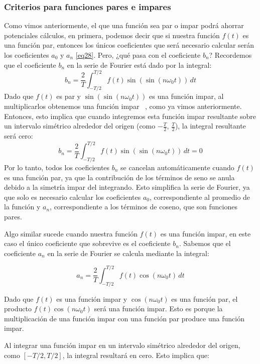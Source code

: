 \subsubsection{Criterios para funciones pares e impares}
Como vimos anteriormente, el que una función sea par o impar podrá ahorrar potenciales cálculos, en primera, podemos decir que si nuestra función $f(t)$ es una función par, entonces los únicos coeficientes que será necesario calcular serán los coeficientes $a_0$ y $a_n$ \eqref{eq28}. Pero, ¿qué pasa con el coeficiente $b_n$?
Recordemos que el coeficiente \( b_n \) en la serie de Fourier está dado por la integral:
\[
b_n = \frac{2}{T} \int_{-T/2}^{T/2} f(t) \sin\left(\sin(n\omega_0 t)\right) \, dt
\]
Dado que \( f(t) \) es par y \( \sin\left(\sin(n\omega_0 t)\right) \) es una función impar, al multiplicarlos obtenemos una función impar ~\cite{matesAvanzadasZill}, como ya vimos anteriormente. Entonces, esto implica que cuando integremos esta función impar resultante sobre un intervalo simétrico alrededor del origen (como $-\frac{T}{2}$, $\frac{T}{2}$), la integral resultante será cero:
\[
b_n = \frac{2}{T} \int_{-T/2}^{T/2} f(t) \sin\left(\sin(n\omega_0 t)\right) \, dt = 0
\]
Por lo tanto, todos los coeficientes \( b_n \) se cancelan automáticamente cuando \( f(t) \) es una función par, ya que la contribución de los términos de seno se anula debido a la simetría impar del integrando. Esto simplifica la serie de Fourier, ya que solo es necesario calcular los coeficientes \( a_0 \), correspondiente al promedio de la función y \( a_n \), correspondiente a los términos de coseno, que son funciones pares. \newline

Algo similar sucede cuando nuestra función $f(t)$ es una función impar, en este caso el único coeficiente que sobrevive es el coeficiente $b_n$. Sabemos que el coeficiente \( a_n \) en la serie de Fourier se calcula mediante la integral:

\[
a_n = \frac{2}{T} \int_{-T/2}^{T/2} f(t) \cos(n \omega_0 t) \, dt
\]

Dado que \( f(t) \) es una función impar y \( \cos(n \omega_0 t) \) es una función par, el producto \( f(t) \cos(n \omega_0 t) \) será una función impar. Esto es porque la multiplicación de una función impar con una función par produce una función impar. ~\cite{matesAvanzadasZill}

Al integrar una función impar en un intervalo simétrico alrededor del origen, como \([-T/2, T/2]\), la integral resultará en cero. Esto implica que:

